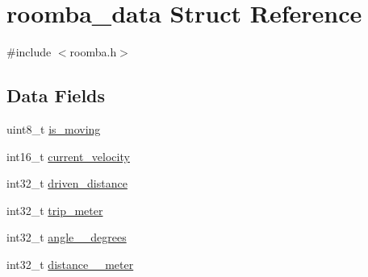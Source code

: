 \hypertarget{structroomba__data}{\section{roomba\-\_\-data \-Struct \-Reference}
\label{structroomba__data}
}


{\ttfamily \#include $<$roomba.\-h$>$}

\subsection*{\-Data \-Fields}
\begin{DoxyCompactItemize}
\item 
uint8\-\_\-t \hyperlink{structroomba__data_a27949ed7575f6665baf658b206ba9cff}{is\-\_\-moving}
\item 
int16\-\_\-t \hyperlink{structroomba__data_a7f174749fed904af98a79cb40f2e9b2c}{current\-\_\-velocity}
\item 
int32\-\_\-t \hyperlink{structroomba__data_a9874cc3ce685901b1a022c32751fff3e}{driven\-\_\-distance}
\item 
int32\-\_\-t \hyperlink{structroomba__data_a00d5dafaa40740d43325df48a57e3bad}{trip\-\_\-meter}
\item 
int32\-\_\-t \hyperlink{structroomba__data_a938f80c21b9bcc3a8598135c5b141b75}{angle\-\_\-\_\-degrees}
\item 
int32\-\_\-t \hyperlink{structroomba__data_aa2702f293fb9d49b8c1d60303ca5ba63}{distance\-\_\-\_\-meter}
\end{DoxyCompactItemize}


